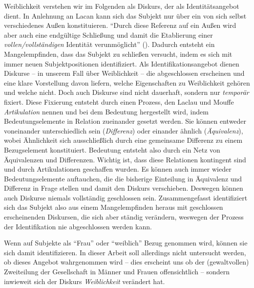 \documentclass[12pt, titlepage=true, toc=bib]{scrartcl}
\begin{document}
Weiblichkeit verstehen wir im Folgenden als Diskurs, der als Identitätsangebot dient. In Anlehnung an Lacan kann sich das Subjekt nur über ein von sich selbst verschiedenes Außen konstituieren. "`Durch diese Referenz auf ein Außen wird aber auch eine endgültige Schließung und damit die Etablierung einer \textit{vollen/vollständigen} Identität verunmöglicht"' (\cite[199; Hervorh. im Orig.]{nonhoff_kollektive_2007}). Dadurch entsteht ein Mangelempfinden, dass das Subjekt zu schließen versucht, indem es sich mit immer neuen Subjektpositionen identifiziert. Als Identifikationsangebot dienen Diskurse -- in unserem Fall über Weiblichkeit -- die abgeschlossen erscheinen und eine klare Vorstellung davon liefern, welche Eigenschaften zu Weiblichkeit gehören und welche nicht. Doch auch Diskurse sind nicht dauerhaft, sondern nur \textit{temporär} fixiert. Diese Fixierung entsteht durch einen Prozess, den Laclau und Mouffe \textit{Artikulation} nennen und bei dem Bedeutung hergestellt wird, indem Bedeutungselemente in Relation zueinander gesetzt werden. Sie können entweder voneinander unterschiedlich sein (\textit{Differenz}) oder einander ähnlich (\textit{Äquivalenz}), wobei Ähnlichkeit sich ausschließlich durch eine gemeinsame Differenz zu einem Bezugselement konstituiert. Bedeutung entsteht also durch ein Netz von Äquivalenzen und Differenzen. Wichtig ist, dass diese Relationen kontingent sind und durch Artikulationen geschaffen wurden. Es können auch immer wieder Bedeutungselemente auftauchen, die die bisherige Einteilung in Äquivalenz und Differenz in Frage stellen und damit den Diskurs verschieben. Deswegen können auch Diskurse niemals vollständig geschlossen sein. Zusammengefasst identifiziert sich das Subjekt also aus einem Mangelempfinden heraus mit geschlossen erscheinenden Diskursen, die sich aber ständig verändern, weswegen der Prozess der Identifikation nie abgeschlossen werden kann.

Wenn auf Subjekte als "`Frau"' oder "`weiblich"' Bezug genommen wird, können sie sich damit identifizieren. In dieser Arbeit soll allerdings nicht untersucht werden, ob dieses Angebot wahrgenommen wird -- dies erscheint uns ob der (gewaltvollen) Zweiteilung der Gesellschaft in Männer und Frauen offensichtlich -- sondern inwieweit sich der Diskurs \textit{Weiblichkeit} verändert hat. 
\end{document}

